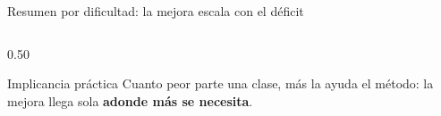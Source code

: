 \begin{frame}{Resumen por dificultad: la mejora escala con el déficit}
\begin{columns}[T]
\begin{column}{0.50\textwidth}
\vspace{0.4em}
\begin{block}{\small Implicancia práctica}
\scriptsize
Cuanto peor parte una clase, más la ayuda el método: la mejora llega sola \textbf{adonde más se necesita}.
\end{block}
\end{column}

\end{columns}

\end{frame}

\iffalse
